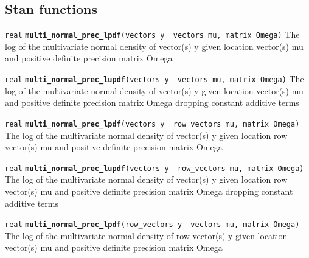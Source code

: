 \documentclass[
  10pt,
]{book}
\begin{document}
\hypertarget{stan-functions-49}{%
\subsection{Stan functions}\label{stan-functions-49}}


\texttt{real} \textbf{\texttt{multi\_normal\_prec\_lpdf}}\texttt{(vectors\ y\ \textbar{}\ vectors\ mu,\ matrix\ Omega)}\newline
The log of the multivariate normal density of vector(s) y given
location vector(s) mu and positive definite precision matrix Omega


\texttt{real} \textbf{\texttt{multi\_normal\_prec\_lupdf}}\texttt{(vectors\ y\ \textbar{}\ vectors\ mu,\ matrix\ Omega)}\newline
The log of the multivariate normal density of vector(s) y given
location vector(s) mu and positive definite precision matrix Omega
dropping constant additive terms


\texttt{real} \textbf{\texttt{multi\_normal\_prec\_lpdf}}\texttt{(vectors\ y\ \textbar{}\ row\_vectors\ mu,\ matrix\ Omega)}\newline
The log of the multivariate normal density of vector(s) y given
location row vector(s) mu and positive definite precision matrix Omega


\texttt{real} \textbf{\texttt{multi\_normal\_prec\_lupdf}}\texttt{(vectors\ y\ \textbar{}\ row\_vectors\ mu,\ matrix\ Omega)}\newline
The log of the multivariate normal density of vector(s) y given
location row vector(s) mu and positive definite precision matrix Omega
dropping constant additive terms


\texttt{real} \textbf{\texttt{multi\_normal\_prec\_lpdf}}\texttt{(row\_vectors\ y\ \textbar{}\ vectors\ mu,\ matrix\ Omega)}\newline
The log of the multivariate normal density of row vector(s) y given
location vector(s) mu and positive definite precision matrix Omega
\end{document}
